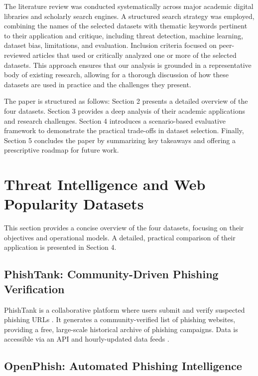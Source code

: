 \documentclass[journal,article,submit,pdftex,moreauthors]{Definitions/mdpi}
\begin{document}
The literature review was conducted systematically across major academic digital libraries and scholarly search engines. A structured search strategy was employed, combining the names of the selected datasets with thematic keywords pertinent to their application and critique, including threat detection, machine learning, dataset bias, limitations, and evaluation. Inclusion criteria focused on peer-reviewed articles that used or critically analyzed one or more of the selected datasets. This approach ensures that our analysis is grounded in a representative body of existing research, allowing for a thorough discussion of how these datasets are used in practice and the challenges they present.

The paper is structured as follows: Section 2 presents a detailed overview of the four datasets. Section 3 provides a deep analysis of their academic applications and research challenges. Section 4 introduces a scenario-based evaluative framework to demonstrate the practical trade-offs in dataset selection. Finally, Section 5 concludes the paper by summarizing key takeaways and offering a prescriptive roadmap for future work.

\section{Threat Intelligence and Web Popularity Datasets}

This section provides a concise overview of the four datasets, focusing on their objectives and operational models. A detailed, practical comparison of their application is presented in Section 4.

\subsection{PhishTank: Community-Driven Phishing Verification}

PhishTank is a collaborative platform where users submit and verify suspected phishing URLs \citep{ref-1,ref-5}. It generates a community-verified list of phishing websites, providing a free, large-scale historical archive of phishing campaigns. Data is accessible via an API and hourly-updated data feeds \citep{ref-6}.

\subsection{OpenPhish: Automated Phishing Intelligence}
\end{document}
